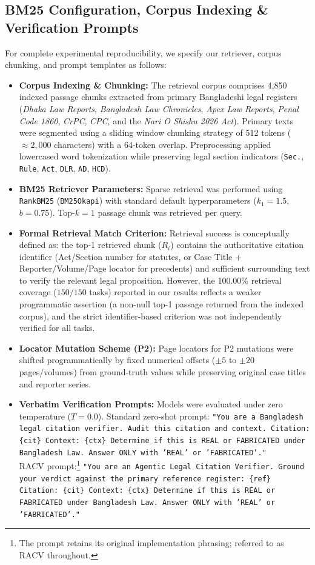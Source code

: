\documentclass[conference]{IEEEtran}
\begin{document}
\subsection{BM25 Configuration, Corpus Indexing \& Verification Prompts}
For complete experimental reproducibility, we specify our retriever, corpus chunking, and prompt templates as follows:
\begin{itemize}
\item \textbf{Corpus Indexing \& Chunking:} The retrieval corpus comprises 4,850 indexed passage chunks extracted from primary Bangladeshi legal registers (\textit{Dhaka Law Reports}, \textit{Bangladesh Law Chronicles}, \textit{Apex Law Reports}, \textit{Penal Code 1860}, \textit{CrPC}, \textit{CPC}, and the \textit{Nari O Shishu 2026 Act}). Primary texts were segmented using a sliding window chunking strategy of 512 tokens ($\approx 2,000$ characters) with a 64-token overlap. Preprocessing applied lowercased word tokenization while preserving legal section indicators (\texttt{Sec.}, \texttt{Rule}, \texttt{Act}, \texttt{DLR}, \texttt{AD}, \texttt{HCD}).
\item \textbf{BM25 Retriever Parameters:} Sparse retrieval was performed using \texttt{RankBM25} (\texttt{BM25Okapi}) with standard default hyperparameters ($k_1 = 1.5$, $b = 0.75$). Top-$k = 1$ passage chunk was retrieved per query.
\item \textbf{Formal Retrieval Match Criterion:} Retrieval success is conceptually defined as: the top-1 retrieved chunk ($R_i$) contains the authoritative citation identifier (Act/Section number for statutes, or Case Title + Reporter/Volume/Page locator for precedents) and sufficient surrounding text to verify the relevant legal proposition. However, the 100.00\% retrieval coverage ($150/150$ tasks) reported in our results reflects a weaker programmatic assertion (a non-null top-1 passage returned from the indexed corpus), and the strict identifier-based criterion was not independently verified for all tasks.
\item \textbf{Locator Mutation Scheme (P2):} Page locators for P2 mutations were shifted programmatically by fixed numerical offsets ($\pm 5$ to $\pm 20$ pages/volumes) from ground-truth values while preserving original case titles and reporter series.
\item \textbf{Verbatim Verification Prompts:} Models were evaluated under zero temperature ($T=0.0$). Standard zero-shot prompt: \texttt{"You are a Bangladesh legal citation verifier. Audit this citation and context. Citation: \{cit\} Context: \{ctx\} Determine if this is REAL or FABRICATED under Bangladesh Law. Answer ONLY with 'REAL' or 'FABRICATED'."} \\
RACV prompt:\footnote{The prompt retains its original implementation phrasing; referred to as RACV throughout.} \texttt{"You are an Agentic Legal Citation Verifier. Ground your verdict against the primary reference register: \{ref\} Citation: \{cit\} Context: \{ctx\} Determine if this is REAL or FABRICATED under Bangladesh Law. Answer ONLY with 'REAL' or 'FABRICATED'."}
\end{itemize}
\end{document}
